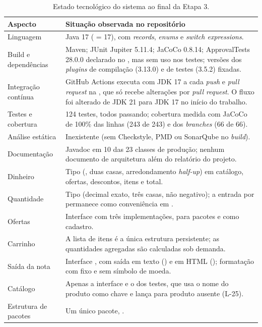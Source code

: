 \begin{table}[H]\centering\small\singlespacing
\begin{tabularx}{\textwidth}{>{\raggedright\arraybackslash}p{3.6cm}Y}
\toprule \textbf{Aspecto} & \textbf{Situação observada no repositório} \\ \midrule
Linguagem & Java 17 ( = 17), com \textit{records}, \textit{enums} e \textit{switch expressions}. \\
Build e dependências & Maven; JUnit Jupiter 5.11.4; JaCoCo 0.8.14; ApprovalTests 28.0.0 declarado no , mas sem uso nos testes; versões dos \textit{plugins} de compilação (3.13.0) e de testes (3.5.2) fixadas. \\
Integração contínua & GitHub Actions executa  com JDK 17 a cada \textit{push} e \textit{pull request} na , que só recebe alterações por \textit{pull request}. O fluxo foi alterado de JDK 21 para JDK 17 no início do trabalho. \\
Testes e cobertura & 124 testes, todos passando; cobertura medida com JaCoCo de 100\% das linhas (243 de 243) e dos \textit{branches} (66 de 66). \\
Análise estática & Inexistente (sem Checkstyle, PMD ou SonarQube no \textit{build}). \\
Documentação & Javadoc em 10 das 23 classes de produção; nenhum documento de arquitetura além do relatório do projeto. \\
Dinheiro & Tipo  (, duas casas, arredondamento \textit{half-up}) em catálogo, ofertas, descontos, itens e total. \\
Quantidade & Tipo  (decimal exato, três casas, não negativo); a entrada por  permanece como conveniência em . \\
Ofertas & Interface  com três implementações,  para pacotes e  como cadastro. \\
Carrinho & A lista de itens é a única estrutura persistente; as quantidades agregadas são calculadas sob demanda. \\
Saída da nota & Interface , com saída em texto () e em HTML (); formatação com  fixo e sem símbolo de moeda. \\
Catálogo & Apenas a interface  e o  dos testes, que usa o nome do produto como chave e lança  para produto ausente (L-25). \\
Estrutura de pacotes & Um único pacote, . \\
\bottomrule\end{tabularx}
\caption{Estado tecnológico do sistema ao final da Etapa 3.}\end{table}

